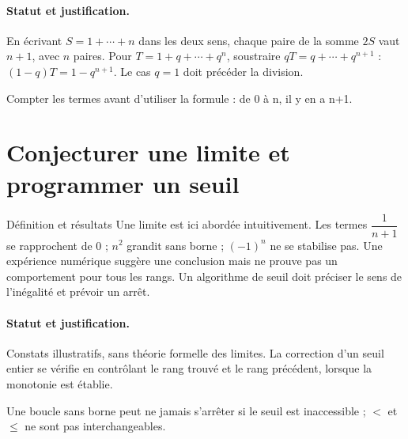 \paragraph{Statut et justification.} En écrivant $S=1+\cdots+n$ dans les deux sens, chaque paire de la somme $2S$ vaut $n+1$, avec $n$ paires. Pour $T=1+q+\cdots+q^n$, soustraire $qT=q+\cdots+q^{n+1}$ : $(1-q)T=1-q^{n+1}$. Le cas $q=1$ doit précéder la division.
\label{C01-EX4}
\begin{erreur}Compter les termes avant d’utiliser la formule : de 0 à n, il y en a n+1.\end{erreur}
\label{C01-AP4}
\section{Conjecturer une limite et programmer un seuil}\label{C01-U5}
\begin{repere}{Définition et résultats}
Une limite est ici abordée intuitivement. Les termes $\dfrac{1}{n+1}$ se rapprochent de 0 ; $n^2$ grandit sans borne ; $(-1)^n$ ne se stabilise pas. Une expérience numérique suggère une conclusion mais ne prouve pas un comportement pour tous les rangs. Un algorithme de seuil doit préciser le sens de l’inégalité et prévoir un arrêt.
\end{repere}
\paragraph{Statut et justification.} Constats illustratifs, sans théorie formelle des limites. La correction d’un seuil entier se vérifie en contrôlant le rang trouvé et le rang précédent, lorsque la monotonie est établie.
\label{C01-EX5}
\begin{erreur}Une boucle sans borne peut ne jamais s’arrêter si le seuil est inaccessible ; $<$ et $\leq$ ne sont pas interchangeables.\end{erreur}
\label{C01-AP5}
